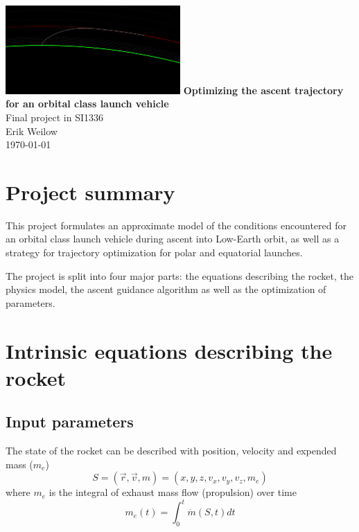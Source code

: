 \documentclass[11pt]{article}
\begin{document}
\begin{titlepage}
  \centering
  \vfill
  \vfill
  \includegraphics[width=0.5\textwidth]{./220km.png}
  \vskip3cm
  {\Large
  \textbf{Optimizing the ascent trajectory for an orbital class launch vehicle}\\
  \vskip0.25cm
  Final project in SI1336\\
      \vskip1cm
      Erik Weilow\\
      \vskip0.5cm
      \today\\
  }    
  \vfill
  \vfill
\end{titlepage}
\newpage

\section{Project summary}
This project formulates an approximate model of the conditions encountered for an orbital class launch vehicle during ascent into Low-Earth orbit,
as well as a strategy for trajectory optimization for polar and equatorial launches.

The project is split into four major parts: the equations describing the rocket, the physics model, the ascent guidance algorithm as well as the optimization of parameters.

\section{Intrinsic equations describing the rocket}
\subsection{Input parameters}
The state of the rocket can be described with position, velocity and expended mass ($m_e$)
$$
S = (\vec{r}, \vec{v}, m) = (x, y, z, v_x, v_y, v_z, m_e)
$$
where $m_e$ is the integral of exhaust mass flow (propulsion) over time
$$
m_e(t) = \int_0^t \dot{m}(S,t) dt
$$
\end{document}
